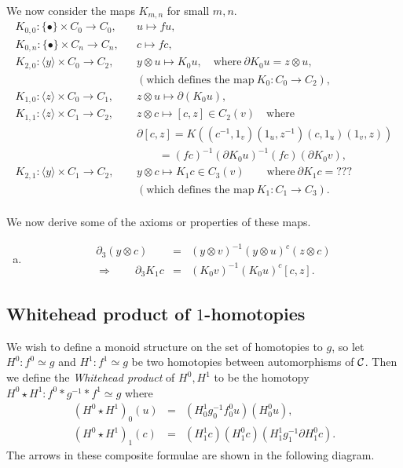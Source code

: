 \newpage
We now consider the maps $K_{m,n}$ for small $m,n$. 
\begin{eqnarray*}
K_{0,0} : \{\bullet\}\times C_0 \to C_0,  
  &&  u \mapsto fu, \\
K_{0,n} : \{\bullet\}\times C_n \to C_n,  
  &&  c \mapsto fc, \\
K_{2,0} : \langle y \rangle \times C_0 \to C_2,  
  &&  y \otimes u \mapsto K_0 u, 
      \quad\text{where}~ \partial K_0 u = z \otimes u, \\
  &&  (\text{which defines the map}~ K_0 : C_0 \to C_2), \\
K_{1,0} : \langle z \rangle \times C_0 \to C_1,  
  &&  z \otimes u \mapsto \partial(K_0u), \\
K_{1,1} : \langle z \rangle \times C_1 \to C_2,  
  &&  z \otimes c \mapsto [c,z] \in C_2(v) \quad \text{where} \\
  &&  \partial[c,z] = K\left((c^{-1},1_v)(1_u,z^{-1})(c,1_u)(1_v,z)\right) \\
  &&  \quad\quad = (fc)^{-1}(\partial K_0u)^{-1}(fc)(\partial K_0 v), \\
K_{2,1} : \langle y \rangle \times C_1 \to C_2,  
  &&  y \otimes c \mapsto K_1c \in C_3(v) 
      \qquad\text{where}~ \partial K_1 c = ??? \\
  &&  (\text{which defines the map}~ K_1 : C_1 \to C_3). \\
\end{eqnarray*}

\noindent
We now derive some of the axioms or properties of these maps. 

\noindent
\begin{enumerate}[(a)] 
\item

\begin{eqnarray*}
\partial_3(y \otimes c) 
  &=&  (y \otimes v)^{-1}(y \otimes u)^c(z \otimes c) \\
\Rightarrow \qquad \partial_3 K_1c 
  &=& (K_0 v)^{-1} (K_0 u)^c [c,z].
\end{eqnarray*}
\end{enumerate}


\newpage
\subsection{Whitehead product of $1$-homotopies}
\label{subsect:wprod-xcomp}

We wish to define a monoid structure on the set of homotopies to $g$, 
so let $H^0 : f^0 \simeq g$ and $H^1 : f^1 \simeq g$ be two homotopies 
between automorphisms of $\mathcal{C}$. 
Then we define the \emph{Whitehead product} of $H^0,H^1$ to be 
the homotopy $H^0 \star H^1 : f^0*g^{-1}*f^1 \simeq g$ where 
\begin{eqnarray*}
(H^0 \star H^1)_0(u) &=& (H^1_0g^{-1}_0f^0_0u)(H^0_0u), \\ 
(H^0 \star H^1)_1(c) &=& (H^1_1c)(H^0_1c)(H^1_1g^{-1}_1\partial H^0_1c). 
\end{eqnarray*}
The arrows in these composite formulae are shown in the following diagram.

